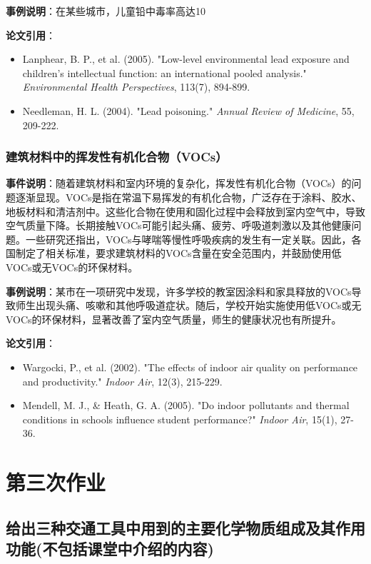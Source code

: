 \documentclass[UTF8]{report}
\theoremstyle{MyLineTheoremStyle} %
\theoremstyle{MyBlockTheoremStyle} %
\theoremstyle{MySubsubsectionStyle} %
\begin{document}
\textbf{事例说明}：在某些城市，儿童铅中毒率高达10%

\textbf{论文引用}：
\begin{itemize}
    \item Lanphear, B. P., et al. (2005). "Low-level environmental lead exposure and children's intellectual function: an international pooled analysis." \textit{Environmental Health Perspectives}, 113(7), 894-899.
    \item Needleman, H. L. (2004). "Lead poisoning." \textit{Annual Review of Medicine}, 55, 209-222.
\end{itemize}

\subsection{建筑材料中的挥发性有机化合物（VOCs）}
\textbf{事件说明}：随着建筑材料和室内环境的复杂化，挥发性有机化合物（VOCs）的问题逐渐显现。VOCs是指在常温下易挥发的有机化合物，广泛存在于涂料、胶水、地板材料和清洁剂中。这些化合物在使用和固化过程中会释放到室内空气中，导致空气质量下降。长期接触VOCs可能引起头痛、疲劳、呼吸道刺激以及其他健康问题。一些研究还指出，VOCs与哮喘等慢性呼吸疾病的发生有一定关联。因此，各国制定了相关标准，要求建筑材料的VOCs含量在安全范围内，并鼓励使用低VOCs或无VOCs的环保材料。

\textbf{事例说明}：某市在一项研究中发现，许多学校的教室因涂料和家具释放的VOCs导致师生出现头痛、咳嗽和其他呼吸道症状。随后，学校开始实施使用低VOCs或无VOCs的环保材料，显著改善了室内空气质量，师生的健康状况也有所提升。

\textbf{论文引用}：
\begin{itemize}
    \item Wargocki, P., et al. (2002). "The effects of indoor air quality on performance and productivity." \textit{Indoor Air}, 12(3), 215-229.
    \item Mendell, M. J., \& Heath, G. A. (2005). "Do indoor pollutants and thermal conditions in schools influence student performance?" \textit{Indoor Air}, 15(1), 27-36.
\end{itemize}


\chapter{第三次作业}

\section{给出三种交通工具中用到的主要化学物质组成及其作用功能(不包括课堂中介绍的内容)}
\end{document}
